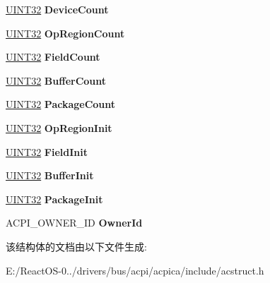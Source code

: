 \begin{DoxyCompactItemize}
\hyperlink{_processor_bind_8h_ae1e6edbbc26d6fbc71a90190d0266018}{U\+I\+N\+T32} {\bfseries Device\+Count}
\item 
\mbox{\label{structacpi__init__walk__info_aa6e606fe85a0c265bc69333b2a4b40f5}} 
\hyperlink{_processor_bind_8h_ae1e6edbbc26d6fbc71a90190d0266018}{U\+I\+N\+T32} {\bfseries Op\+Region\+Count}
\item 
\mbox{\label{structacpi__init__walk__info_ab0145e037445c09ea06075ffda5e967e}} 
\hyperlink{_processor_bind_8h_ae1e6edbbc26d6fbc71a90190d0266018}{U\+I\+N\+T32} {\bfseries Field\+Count}
\item 
\mbox{\label{structacpi__init__walk__info_a5f51e1154a6209be8b6efa4c4349501a}} 
\hyperlink{_processor_bind_8h_ae1e6edbbc26d6fbc71a90190d0266018}{U\+I\+N\+T32} {\bfseries Buffer\+Count}
\item 
\mbox{\label{structacpi__init__walk__info_a0b3f3c4217f24a3141d076fbccc74914}} 
\hyperlink{_processor_bind_8h_ae1e6edbbc26d6fbc71a90190d0266018}{U\+I\+N\+T32} {\bfseries Package\+Count}
\item 
\mbox{\label{structacpi__init__walk__info_a152aaf3d66a17b4aeed413c71dd8376a}} 
\hyperlink{_processor_bind_8h_ae1e6edbbc26d6fbc71a90190d0266018}{U\+I\+N\+T32} {\bfseries Op\+Region\+Init}
\item 
\mbox{\label{structacpi__init__walk__info_a6d1c0e27d2f73daf9d123ffb045bda8e}} 
\hyperlink{_processor_bind_8h_ae1e6edbbc26d6fbc71a90190d0266018}{U\+I\+N\+T32} {\bfseries Field\+Init}
\item 
\mbox{\label{structacpi__init__walk__info_a2b7b921ad486d69c8c8576a8f36550bc}} 
\hyperlink{_processor_bind_8h_ae1e6edbbc26d6fbc71a90190d0266018}{U\+I\+N\+T32} {\bfseries Buffer\+Init}
\item 
\mbox{\label{structacpi__init__walk__info_aa0f45db2313a79e85c940e060cd4ae4d}} 
\hyperlink{_processor_bind_8h_ae1e6edbbc26d6fbc71a90190d0266018}{U\+I\+N\+T32} {\bfseries Package\+Init}
\item 
\mbox{\label{structacpi__init__walk__info_a54990bef25a51653f0a6015969a6a3c5}} 
A\+C\+P\+I\+\_\+\+O\+W\+N\+E\+R\+\_\+\+ID {\bfseries Owner\+Id}
\end{DoxyCompactItemize}


该结构体的文档由以下文件生成\+:\begin{DoxyCompactItemize}
\item 
E\+:/\+React\+O\+S-\/0../drivers/bus/acpi/acpica/include/acstruct.\+h\end{DoxyCompactItemize}
